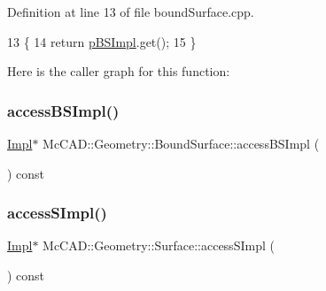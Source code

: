 Definition at line 13 of file bound\+Surface.\+cpp.


\begin{DoxyCode}
13                                              \{
14   \textcolor{keywordflow}{return} \hyperlink{classMcCAD_1_1Geometry_1_1BoundSurface_ae678fabb46e22b7a68a336051b366ddf}{pBSImpl}.get();
15 \}
\end{DoxyCode}
Here is the caller graph for this function\+:
\mbox{\label{classMcCAD_1_1Geometry_1_1BoundSurface_a7b638aa31593926d6210aad6a30e1f47}} 
\subsubsection{\texorpdfstring{access\+B\+S\+Impl()}{accessBSImpl()}\hspace{0.1cm}{\footnotesize\ttfamily [2/2]}}
{\footnotesize\ttfamily \hyperlink{classMcCAD_1_1Geometry_1_1BoundSurface_1_1Impl}{Impl}$\ast$ Mc\+C\+A\+D\+::\+Geometry\+::\+Bound\+Surface\+::access\+B\+S\+Impl (\begin{DoxyParamCaption}{ }\end{DoxyParamCaption}) const}

\mbox{\label{classMcCAD_1_1Geometry_1_1Surface_adafee834670eb8c97025e24ffd6df844}} 
\subsubsection{\texorpdfstring{access\+S\+Impl()}{accessSImpl()}\hspace{0.1cm}{\footnotesize\ttfamily [1/2]}}
{\footnotesize\ttfamily \hyperlink{classMcCAD_1_1Geometry_1_1BoundSurface_1_1Impl}{Impl}$\ast$ Mc\+C\+A\+D\+::\+Geometry\+::\+Surface\+::access\+S\+Impl (\begin{DoxyParamCaption}{ }\end{DoxyParamCaption}) const\hspace{0.3cm}{\ttfamily [inherited]}}

